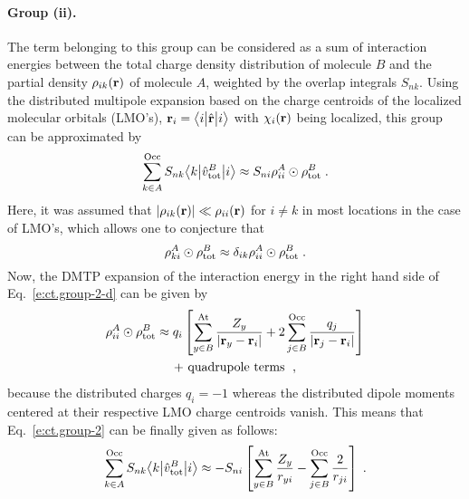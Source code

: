 \documentclass[aip,jcp,amsmath,amssymb,reprint,floatfix]{revtex4-1}
\begin{document}
\paragraph{Group (ii).}
The term belonging to this group can be considered as a sum of interaction
energies between the total charge density distribution of molecule $B$
and the partial density $\rho_{ik}({\bf r})$ of molecule $A$,
weighted by the overlap integrals $S_{nk}$. Using the distributed multipole 
expansion based on the charge centroids of the localized molecular orbitals (LMO's),
${\bf r}_i = \bigl\langle {i} \bigl\lvert {\hat{\bf r}} \bigl\lvert {i} \bigr\rangle$ with $\chi_i({\bf r})$ being localized,
this group can be approximated by
%
\begin{equation} \label{e:ct.group-2}
       \sum_{k\in A}^{\rm Occ} S_{nk}  \bigl\langle {k} \bigl\lvert {\hat{v}^B_{\rm tot} } \bigl\lvert {i} \bigr\rangle 
 \approx  S_{ni} \rho_{ii}^A \odot \rho^B_{\rm tot} \;.
\end{equation}
%
Here, it was assumed that
$\lvert\rho_{ik} ({\bf r}) \rvert \ll \rho_{ii} ({\bf r}) $ 
for $i\ne k$ in most locations in the case of LMO's,
which allows one to conjecture that
%
\begin{equation} \label{e:ct.group-2-d}
 \rho_{ki}^A \odot \rho^B_{\rm tot} \approx \delta_{ik} \rho_{ii}^A \odot \rho^B_{\rm tot} \;.
\end{equation}
%
Now, the DMTP expansion 
of the interaction energy in the right hand 
side of Eq.~\eqref{e:ct.group-2-d} can be given by
%
\begin{multline}
 \rho_{ii}^A \odot \rho^B_{\rm tot} 
 \approx 
 q_{i} 
 \left[
 \sum_{y\in B}^{\rm At}
  \frac{Z_y}{\vert {\bf r}_y - {\bf r}_i \vert } 
 +
 2\sum_{j\in B}^{\rm Occ}
  \frac{q_j}{\vert {\bf r}_j - {\bf r}_i \vert } 
 \right] \\
 + \text{ quadrupole terms } \;,
\end{multline}
%
because the distributed charges
$q_i = -1$ whereas the distributed dipole moments %
centered at their
respective LMO charge centroids vanish.\cite{Etchebest.Lavery.Pullman.TheorChimActa.1982}
This means that Eq.~\eqref{e:ct.group-2} can be finally given as follows:
%
\begin{equation} \label{e:ct.group-ii.final}
       \sum_{k\in A}^{\rm Occ} S_{nk} \bigl\langle {k} \bigl\lvert {\hat{v}^B_{\rm tot} } \bigl\lvert {i} \bigr\rangle 
 \approx - S_{ni}  \left[
 \sum_{y\in B}^{\rm At}
  \frac{Z_y}{ r_{yi} } 
 -
 \sum_{j\in B}^{\rm Occ}
  \frac{2}{r_{ji}} 
 \right] \;.
\end{equation}
\end{document}
